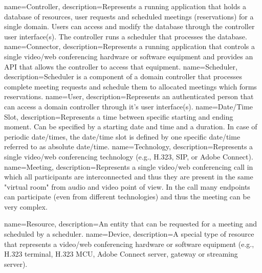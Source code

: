%
%
{
  name=Controller,
  description={Represents a running application that holds a database of 
    resources, user requests and scheduled meetings (reservations) for a single 
    domain. Users can access and modify the database through the controller 
    user interface(s). The controller runs a scheduler that processes the 
    database.}
}
{
  name=Connector,
  description={Represents a running application that controls a single 
    video/web conferencing hardware or software equipment and provides an API 
    that allows the controller to access that equipment.}
}
{
  name=Scheduler,
  description={Scheduler is a component of a domain controller that processes 
    complete meeting requests and schedule them to allocated meetings which 
    forms reservations.}
}
{
  name=User,
  description={Represents an authenticated person that can access a domain 
    controller through it's user interface(s).}
}
{
  name=Date/Time Slot,
  description={Represents a time between specific starting and ending moment. 
    Can be specified by a starting date and time and a duration. In case of
    periodic date/times, the date/time slot is defined by one specific 
    date/time referred to as absolute date/time.}
}
{
  name=Technology,
  description={Represents a single video/web conferencing technology (e.g., 
    H.323, SIP, or Adobe Connect).}
}
{
  name=Meeting,
  description={Represents a single video/web conferencing call in which all 
    participants  are interconnected and thus they are present in the same 
    "virtual room" from audio and video point of view. In the call many 
    endpoints can participate (even from different technologies) and thus the 
    meeting can be very complex.}
}

%
%
{
  name=Resource,
  description={An entity that can be requested for a meeting and scheduled by a 
    scheduler.}
}
{
  name=Device,
  description={A special type of resource that represents a video/web 
    conferencing hardware or software equipment (e.g., H.323 terminal, H.323 
    MCU, Adobe Connect server, gateway or streaming server).}
}


